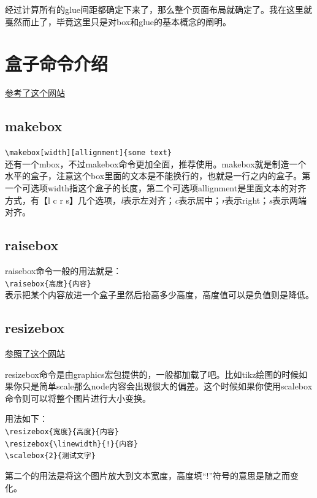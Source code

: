 \documentclass[12pt,oneside]{book}
\begin{document}
\begin{common-format}
经过计算所有的glue间距都确定下来了，那么整个页面布局就确定了。我在这里就戛然而止了，毕竟这里只是对box和glue的基本概念的阐明。


\section{盒子命令介绍}
\href{http://tex.stackexchange.com/questions/83930/what-are-the-different-kinds-of-boxes-in-latex}{参考了这个网站}

\subsection{makebox}
\verb+\makebox[width][allignment]{some text}+\\
还有一个mbox，不过makebox命令更加全面，推荐使用。makebox就是制造一个水平的盒子，注意这个box里面的文本是不能换行的，也就是一行之内的盒子。第一个可选项width指这个盒子的长度，第二个可选项allignment是里面文本的对齐方式，有【l c r s】几个选项，\emph{l}表示左对齐；\emph{c}表示居中；\emph{r}表示right；\emph{s}表示两端对齐。



\subsection{raisebox}
raisebox命令一般的用法就是：\\
\verb+\raisebox{高度}{内容}+\\
表示把某个内容放进一个盒子里然后抬高多少高度，高度值可以是负值则是降低。

\subsection{resizebox}
\href{http://tex.stackexchange.com/questions/13460/scalebox-knowing-how-much-it-scales}{参照了这个网站}

resizebox命令是由graphics宏包提供的，一般都加载了吧。比如tikz绘图的时候如果你只是简单scale那么node内容会出现很大的偏差。这个时候如果你使用scalebox命令则可以将整个图片进行大小变换。

用法如下：\\
\verb+\resizebox{宽度}{高度}{内容} +\\
\verb+\resizebox{\linewidth}{!}{内容}+\\
\verb+\scalebox{2}{测试文字}+

第二个的用法是将这个图片放大到文本宽度，高度填“!”符号的意思是随之而变化。



\end{common-format}
\end{document}
